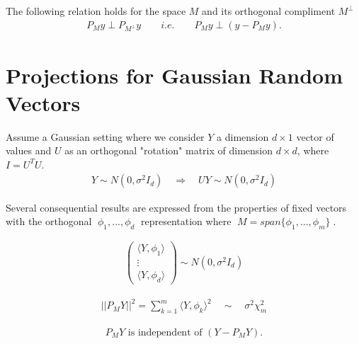 \documentclass[a4paper, 11pt]{report}
\newcommand{\newchapter}[2]{
	\chapter{#1}
	\addtocontents{toc}{\vspace{.1in} \hspace{.25in} $\cdot$ #2 \par}
}
\begin{document}
The following relation holds for the space $M$ and its orthogonal compliment $M^{\perp}$ \vspace{.1in}
\begin{align*}
\boxed{P_My \perp P_{M^{\perp}}y \qquad i.e. \qquad P_My \perp (y - P_My) \bigg.}
\end{align*}






\newchapter{Projections for Gaussian Random Vectors}{2/13/14}

Assume a Gaussian setting where we consider $Y$ a dimension $d \times 1$ vector of values and $U$ as an orthogonal "rotation" matrix of dimension $d\times d$, where $I = U^{T}U$. 
\begin{align*}
	Y \sim N\left(0, \sigma^2 I_d\right)\quad \Rightarrow \quad UY \sim N\left(0, \sigma^2I_d\right)
\end{align*}


Several consequential results are expressed from the properties of fixed vectors with the orthogonal $\; \phi_1,...,\phi_d \;$ representation where  $\; M = span\{\phi_1,...,\phi_m\} \;$.

\begin{align}
	\boxed{\left(\begin{array}{c} \langle Y,\phi_1\rangle \\ \vdots \\ \langle Y,\phi_d\rangle \end{array}\right) \sim N(0,\sigma^2 I_d)}
\end{align}


\vspace{.1in}

\begin{align}
	\boxed{||P_MY||^2 = \sum\limits_{k=1}^m \langle Y,\phi_k\rangle^2 \quad \sim \quad \sigma^2 \chi^2_m}
\end{align}


\vspace{.1in}

\begin{align}
	\boxed{P_MY \text{ is independent of } (Y-P_MY) \bigg.} 
\end{align}








\end{document}
